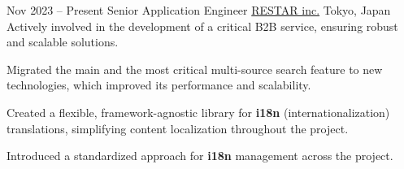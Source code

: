 \cventry
{Nov 2023 – Present}
{Senior Application Engineer}
{\href{https://www.restar-inc.com/}{RESTAR inc.}}
{Tokyo, Japan}
{}
{Actively involved in the development of a critical B2B service, ensuring robust and scalable solutions.}

\cvlistitem
{Migrated the main and the most critical multi-source search feature to new technologies, which improved its performance and scalability.}

\cvlistitem
{Created a flexible, framework-agnostic library for \textbf{i18n} (internationalization) translations, simplifying content localization throughout the project.}

\cvlistitem
{Introduced a standardized approach for \textbf{i18n} management across the project.}
